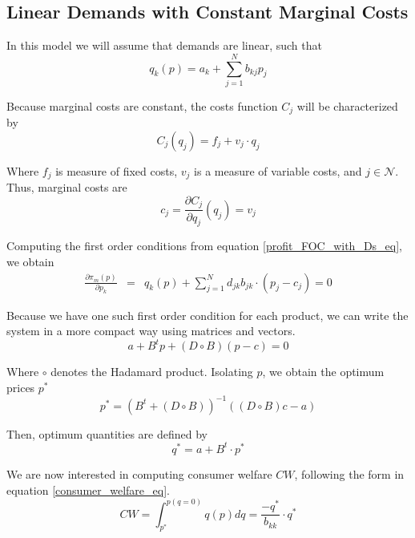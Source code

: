 \documentclass[12pt]{article}
\begin{document}
\subsection{Linear Demands with Constant Marginal Costs}

In this model we will assume that demands are linear, such that
\begin{equation*}
q_k(p) = a_k + \sum_{j=1}^N b_{kj}p_j
\end{equation*}

Because marginal costs are constant, the costs function $C_j$ will be characterized by
\begin{equation*}
C_j (q_j)= f_j + v_j \cdot q_j
\end{equation*}

Where $f_j$ is measure of fixed costs, $v_j$ is a measure of variable costs, and  $j \in \mathcal{N}$. Thus, marginal costs are
\begin{equation*}
c_j = \frac{\partial C_j}{\partial q_j}(q_j) = v_j
\end{equation*}

Computing the first order conditions from equation \ref{profit_FOC_with_Ds_eq}, we obtain
\begin{eqnarray*}
\frac{\partial\pi_m(p)}{\partial p_k}
&=& q_k(p) + \sum_{j = 1}^N d_{jk}b_{jk} \cdot (p_j - c_j) = 0
\end{eqnarray*}

Because we have one such first order condition for each product, we can write the system in a more compact way using matrices and vectors.
\begin{equation*}
a + B^t p + (D \circ B)(p - c) = 0
\end{equation*}

Where $\circ$ denotes the Hadamard product.
Isolating $p$, we obtain the optimum prices $p^*$
\begin{equation*}
p^* = (B^t + (D \circ B))^{-1}((D \circ B) c - a)
\end{equation*}

Then, optimum quantities are defined by
\begin{equation*}
q^* = a + B^t \cdot p^*
\end{equation*}

We are now interested in computing consumer welfare $CW$, following the form in equation \ref{consumer_welfare_eq}. 
\begin{equation*}
CW = \int_{p^*}^{p(q = 0)} q(p) dq = \frac{-q^*}{b_{kk}} \cdot q^*
\end{equation*}
\end{document}
